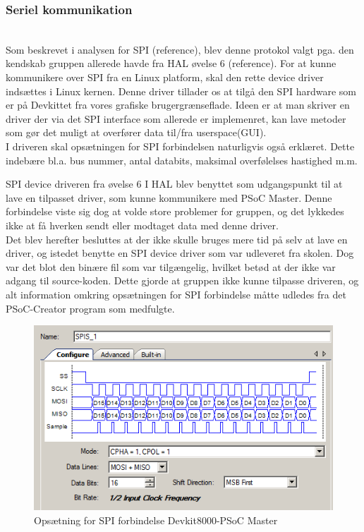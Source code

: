 \subsubsection{Seriel kommunikation}

\\
Som beskrevet i analysen for SPI (reference), blev denne protokol valgt pga. den kendskab gruppen allerede havde fra HAL øvelse 6 (reference). 
For at kunne kommunikere over SPI fra en Linux platform, skal den rette device driver indsættes i Linux kernen. Denne driver tillader os at tilgå
den SPI hardware som er på Devkittet fra vores grafiske brugergrænseflade. Ideen er at man skriver en driver der via det SPI interface som allerede er 
implemenret, kan lave metoder som gør det muligt at overfører data til/fra userspace(GUI).\\

I driveren skal opsætningen for SPI forbindelsen naturligvis også erklæret. Dette indebære bl.a. bus nummer, antal databits, maksimal overfølelses hastighed m.m.  
 
SPI device driveren fra øvelse 6 I HAL blev benyttet som udgangspunkt til at lave en tilpasset driver, som kunne kommunikere med PSoC Master. 
Denne forbindelse viste sig dog at volde store problemer for gruppen, og det lykkedes ikke at få hverken sendt eller modtaget data med denne driver.\\

Det blev herefter besluttes at der ikke skulle bruges mere tid på selv at lave en driver, og istedet benytte en SPI device driver som var udleveret fra skolen.
Dog var det blot den binære fil som var tilgængelig, hvilket betød at der ikke var adgang til source-koden. Dette gjorde at gruppen ikke kunne tilpasse driveren,
og alt information omkring opsætningen for SPI forbindelse måtte udledes fra det PSoC-Creator program som medfulgte. 

\begin{figure}[H]
\includegraphics[scale=0.6]{tex/Design/SPI/Clock_mode_SPI}
\caption{Opsætning for SPI forbindelse Devkit8000-PSoC Master}
\end{figure}

